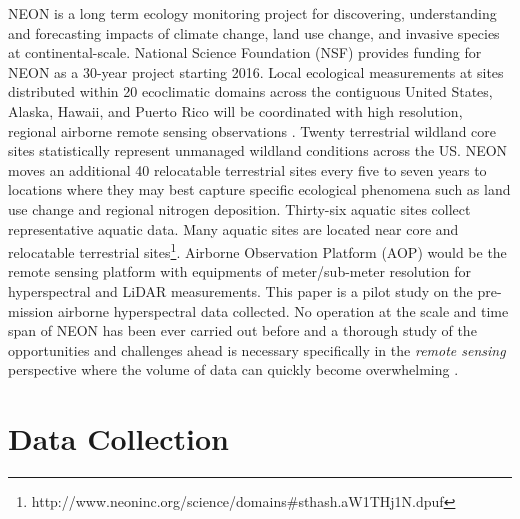 \documentclass[remotesensing,article,accept,moreauthors,pdftex,12pt,a4paper]{mdpi}
\begin{document}
NEON is a long term ecology monitoring project for discovering, understanding and forecasting impacts of climate change, land use change, and invasive species at continental-scale. National Science Foundation (NSF) provides funding for NEON as a 30-year project starting 2016. Local ecological measurements at sites distributed within 20 ecoclimatic domains across the contiguous United States, Alaska, Hawaii, and Puerto Rico will be coordinated with high resolution, regional airborne remote sensing observations \cite{kampe2010neon}. Twenty terrestrial wildland core sites statistically represent unmanaged wildland conditions across the US. NEON moves an additional 40 relocatable terrestrial sites every five to seven years to locations where they may best capture specific ecological phenomena such as land use change and regional nitrogen deposition. Thirty-six aquatic sites collect representative aquatic data. Many aquatic sites are located near core and relocatable terrestrial sites\footnote{http://www.neoninc.org/science/domains\#sthash.aW1THj1N.dpuf}. Airborne Observation Platform (AOP) would be the remote sensing platform with equipments of meter/sub-meter resolution for hyperspectral and LiDAR measurements. This paper is a pilot study on the pre-mission airborne hyperspectral data collected. No operation at the scale and time span of NEON has been ever carried out before and a thorough study of the opportunities and challenges ahead is necessary specifically in the \textit{remote sensing} perspective where the volume of data can quickly become overwhelming \cite{neon2010aopdatarelease}.

\section{Data Collection}
\end{document}

